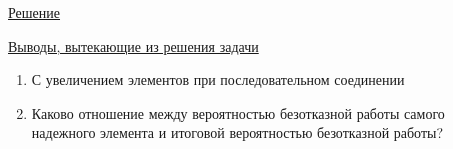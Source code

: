 \underline{Решение}

\bigskip

\underline{Выводы, вытекающие из решения задачи}

\begin{enumerate}
    \item С увеличением элементов при последовательном соединении
    \item Каково отношение между вероятностью безотказной работы самого надежного элемента и итоговой вероятностью безотказной работы?
\end{enumerate}


